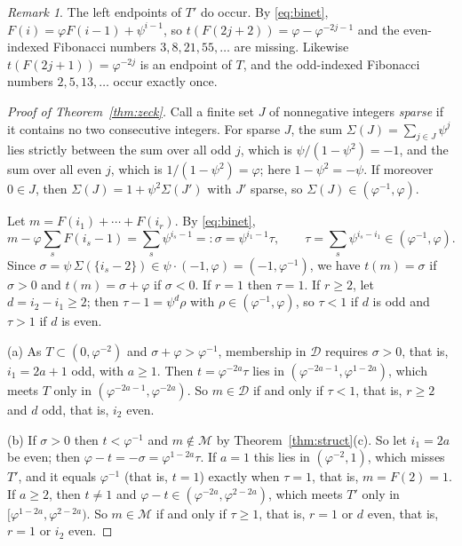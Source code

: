 \documentclass[12pt]{article}
\newcommand{\D}{\mathcal{D}}
\newcommand{\M}{\mathcal{M}}
\theoremstyle{plain}
\theoremstyle{remark}
\newtheorem{remark}[theorem]{Remark}
\begin{document}
\begin{remark}
The left endpoints of $T'$ do occur. By \eqref{eq:binet},
$F(i)=\varphi F(i-1)+\psi^{i-1}$, so $t(F(2j+2))=\varphi-\varphi^{-2j-1}$ and the even-indexed
Fibonacci numbers $3,8,21,55,\dots$ are missing. Likewise $t(F(2j+1))=\varphi^{-2j}$ is an
endpoint of $T$, and the odd-indexed Fibonacci numbers $2,5,13,\dots$ occur exactly once.
\end{remark}

\begin{proof}[Proof of Theorem~\ref{thm:zeck}]
Call a finite set $J$ of nonnegative integers \emph{sparse} if it contains no two consecutive
integers. For sparse $J$, the sum $\Sigma(J)=\sum_{j\in J}\psi^j$ lies strictly between the sum
over all odd $j$, which is $\psi/(1-\psi^2)=-1$, and the sum over all even $j$, which is
$1/(1-\psi^2)=\varphi$; here $1-\psi^2=-\psi$. If moreover $0\in J$, then
$\Sigma(J)=1+\psi^2\Sigma(J')$ with $J'$ sparse, so $\Sigma(J)\in(\varphi^{-1},\varphi)$.

Let $m=F(i_1)+\cdots+F(i_r)$. By \eqref{eq:binet},
\[
m-\varphi\sum_s F(i_s-1)=\sum_s\psi^{i_s-1}=:\sigma=\psi^{i_1-1}\tau,\qquad
\tau=\sum_s\psi^{i_s-i_1}\in(\varphi^{-1},\varphi).
\]
Since $\sigma=\psi\,\Sigma(\{i_s-2\})\in\psi\cdot(-1,\varphi)=(-1,\varphi^{-1})$, we have
$t(m)=\sigma$ if $\sigma>0$ and $t(m)=\sigma+\varphi$ if $\sigma<0$. If $r=1$ then $\tau=1$.
If $r\ge2$, let $d=i_2-i_1\ge2$; then $\tau-1=\psi^d\rho$ with $\rho\in(\varphi^{-1},\varphi)$,
so $\tau<1$ if $d$ is odd and $\tau>1$ if $d$ is even.

(a) As $T\subset(0,\varphi^{-2})$ and $\sigma+\varphi>\varphi^{-1}$, membership in $\D$ requires
$\sigma>0$, that is, $i_1=2a+1$ odd, with $a\ge1$. Then $t=\varphi^{-2a}\tau$ lies in
$(\varphi^{-2a-1},\varphi^{1-2a})$, which meets $T$ only in $(\varphi^{-2a-1},\varphi^{-2a})$. So
$m\in\D$ if and only if $\tau<1$, that is, $r\ge2$ and $d$ odd, that is, $i_2$ even.

(b) If $\sigma>0$ then $t<\varphi^{-1}$ and $m\notin\M$ by Theorem~\ref{thm:struct}(c). So let
$i_1=2a$ be even; then $\varphi-t=-\sigma=\varphi^{1-2a}\tau$. If $a=1$ this lies in
$(\varphi^{-2},1)$, which misses $T'$, and it equals $\varphi^{-1}$ (that is, $t=1$) exactly when
$\tau=1$, that is, $m=F(2)=1$. If $a\ge2$, then $t\ne1$ and $\varphi-t\in(\varphi^{-2a},\varphi^{2-2a})$,
which meets $T'$ only in $[\varphi^{1-2a},\varphi^{2-2a})$. So $m\in\M$ if and only if
$\tau\ge1$, that is, $r=1$ or $d$ even, that is, $r=1$ or $i_2$ even.
\end{proof}
\end{document}
